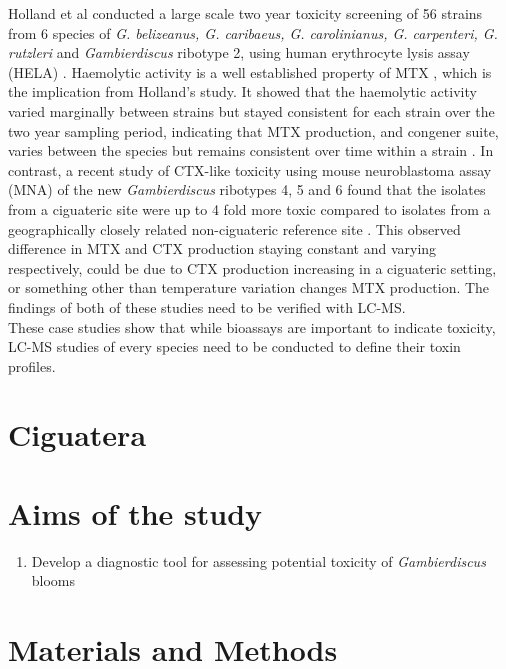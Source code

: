 \documentclass[12pt]{article}
\begin{document}
Holland et al conducted a large scale two year toxicity screening of 56 strains from 6 species of \emph{G. belizeanus, G. caribaeus, G. carolinianus, G. carpenteri, G. rutzleri} and  \emph{Gambierdiscus} ribotype 2, using human erythrocyte lysis assay (HELA) \cite{holland2013differences}. Haemolytic activity is a well established property of MTX \cite{igarashi1999mechanisms}, which is the implication from Holland's study. It showed that the haemolytic activity varied marginally between strains but stayed consistent for each strain over the two year sampling period, indicating that MTX production, and congener suite, varies between the species but remains consistent over time within a strain \cite{holland2013differences}.
In contrast, a recent study of CTX-like toxicity using mouse neuroblastoma assay (MNA) of the new \emph{Gambierdiscus} ribotypes 4, 5 and 6 found that the isolates from a ciguateric site were up to 4\- fold more toxic compared to isolates from a geographically closely related non-ciguateric reference site \cite{xu2014distribution}. This observed difference in MTX and CTX production staying constant and varying respectively, could be due to CTX production increasing in a ciguateric setting, or something other than temperature variation changes MTX production. The findings of both of these studies need to be verified with LC-MS. \\

These case studies show that while bioassays are important to indicate toxicity, LC-MS studies of every species need to be conducted to define their toxin profiles.

\section{Ciguatera}

\section{Aims of the study}

\begin{enumerate}
\item Develop a diagnostic tool for assessing potential toxicity of \emph{Gambierdiscus} blooms
\end{enumerate}

\section{Materials and Methods}
\end{document}
